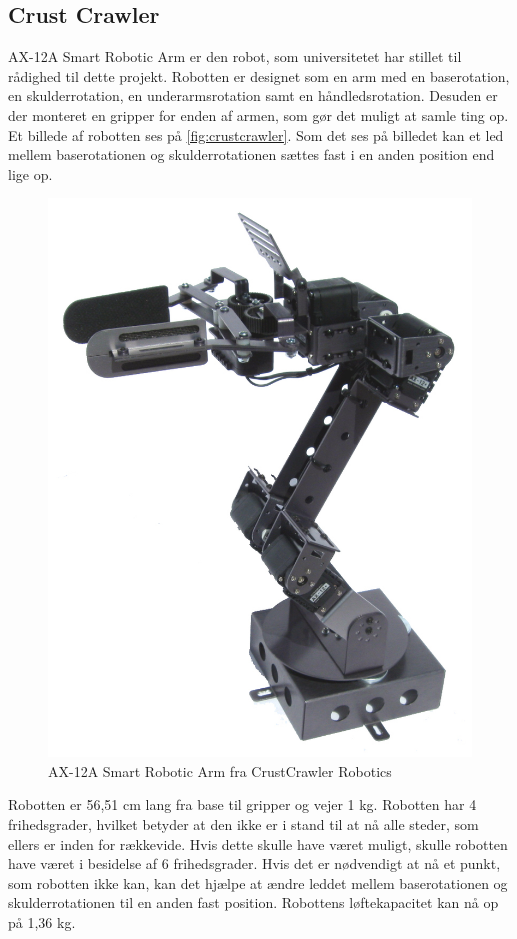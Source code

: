 \subsection{Crust Crawler} %
\label{sub:crust_crawler}

AX-12A Smart Robotic Arm er den robot, som universitetet har stillet til rådighed til dette projekt. Robotten er designet som en arm med en baserotation, en skulderrotation, en underarmsrotation samt en håndledsrotation. Desuden er der monteret en gripper for enden af armen, som gør det muligt at samle ting op. Et billede af robotten ses på \autoref{fig:crustcrawler}. Som det ses på billedet kan et led mellem baserotationen og skulderrotationen sættes fast i en anden position end lige op. \\


\begin{figure}[h]
\centering
\includegraphics[scale=0.45]{images/crustCrawler}
\caption{AX-12A Smart Robotic Arm fra CrustCrawler Robotics}
\label{fig:crustcrawler}
\end{figure}

Robotten er 56,51 cm lang fra base til gripper og vejer 1 kg. Robotten har 4 frihedsgrader, hvilket betyder at den ikke er i stand til at nå alle steder, som ellers er inden for rækkevide. Hvis dette skulle have været muligt, skulle robotten have været i besidelse af 6 frihedsgrader. Hvis det er nødvendigt at nå et punkt, som robotten ikke kan, kan det hjælpe at ændre leddet mellem baserotationen og skulderrotationen til en anden fast position. Robottens løftekapacitet kan nå op på 1,36 kg.

